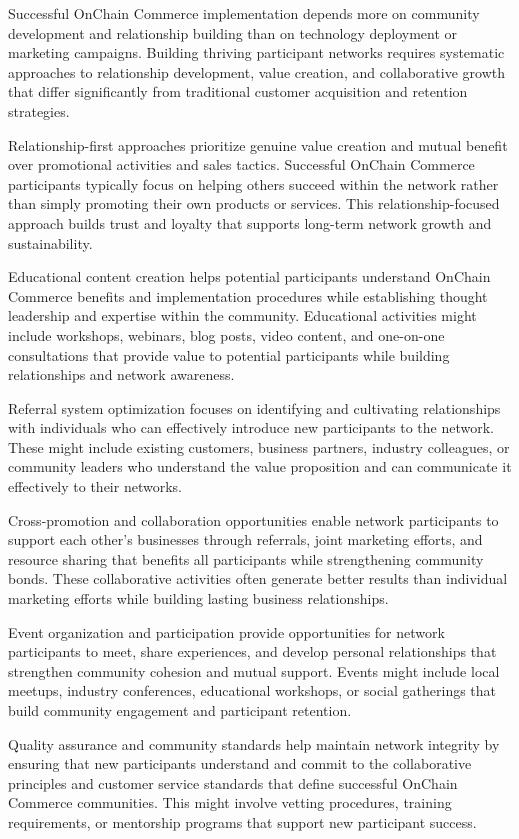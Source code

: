 \documentclass[
  Letterpaper,
]{scrbook}
\begin{document}
Successful OnChain Commerce implementation depends more on community
development and relationship building than on technology deployment or
marketing campaigns. Building thriving participant networks requires
systematic approaches to relationship development, value creation, and
collaborative growth that differ significantly from traditional customer
acquisition and retention strategies.

Relationship-first approaches prioritize genuine value creation and
mutual benefit over promotional activities and sales tactics. Successful
OnChain Commerce participants typically focus on helping others succeed
within the network rather than simply promoting their own products or
services. This relationship-focused approach builds trust and loyalty
that supports long-term network growth and sustainability.

Educational content creation helps potential participants understand
OnChain Commerce benefits and implementation procedures while
establishing thought leadership and expertise within the community.
Educational activities might include workshops, webinars, blog posts,
video content, and one-on-one consultations that provide value to
potential participants while building relationships and network
awareness.

Referral system optimization focuses on identifying and cultivating
relationships with individuals who can effectively introduce new
participants to the network. These might include existing customers,
business partners, industry colleagues, or community leaders who
understand the value proposition and can communicate it effectively to
their networks.

Cross-promotion and collaboration opportunities enable network
participants to support each other's businesses through referrals, joint
marketing efforts, and resource sharing that benefits all participants
while strengthening community bonds. These collaborative activities
often generate better results than individual marketing efforts while
building lasting business relationships.

Event organization and participation provide opportunities for network
participants to meet, share experiences, and develop personal
relationships that strengthen community cohesion and mutual support.
Events might include local meetups, industry conferences, educational
workshops, or social gatherings that build community engagement and
participant retention.

Quality assurance and community standards help maintain network
integrity by ensuring that new participants understand and commit to the
collaborative principles and customer service standards that define
successful OnChain Commerce communities. This might involve vetting
procedures, training requirements, or mentorship programs that support
new participant success.
\end{document}
